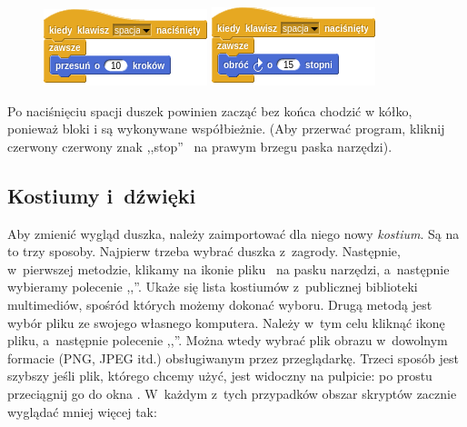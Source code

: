 \documentclass[a4paper]{report}
\begin{document}
\begin{figure}[H]
\begin{minipage}{0.5\textwidth}
\centering
\includegraphics[scale=\defaultGraphicsScale]{duszki-i-wspolbieznosc-3}
\end{minipage}%
\begin{minipage}{0.5\textwidth}
\centering
\includegraphics[scale=\defaultGraphicsScale]{duszki-i-wspolbieznosc-4}
\end{minipage}
\end{figure}

Po naciśnięciu spacji duszek powinien zacząć bez końca chodzić w kółko, ponieważ bloki  i  są wykonywane współbieżnie. (Aby przerwać program, kliknij czerwony czerwony znak ,,stop''~ na prawym brzegu paska narzędzi).

\subsection{Kostiumy i~dźwięki}

Aby zmienić wygląd duszka, należy zaimportować dla niego nowy \emph{kostium}. Są na to trzy sposoby. Najpierw trzeba wybrać duszka z~zagrody. Następnie, w~pierwszej metodzie, klikamy na ikonie pliku~ na pasku narzędzi, a~następnie wybieramy polecenie ,,''. Ukaże się lista kostiumów z~publicznej biblioteki multimediów, spośród których możemy dokonać wyboru. Drugą metodą jest wybór pliku ze swojego własnego komputera. Należy w~tym celu kliknąć ikonę pliku, a~następnie polecenie ,,''. Można wtedy wybrać plik obrazu w~dowolnym formacie (PNG, JPEG itd.) obsługiwanym przez przeglądarkę. Trzeci sposób jest szybszy jeśli plik, którego chcemy użyć, jest widoczny na pulpicie: po prostu przeciągnij go do okna . W~każdym z~tych przypadków obszar skryptów zacznie wyglądać mniej więcej tak:\nopagebreak

\end{document}

